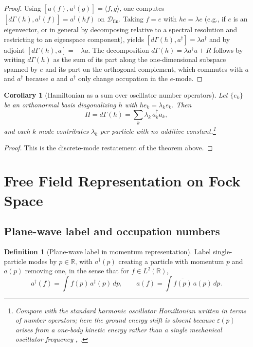 \documentclass[11pt]{article}
\theoremstyle{definition}
\newtheorem{definition}{Definition}
\theoremstyle{plain}
\newtheorem{corollary}{Corollary}
\numberwithin{equation}{section}
\begin{document}
\begin{proof}
Using $[a(f),a^\dagger(g)]=\langle f,g\rangle$, one computes $[d\Gamma(h),a^\dagger(f)]=a^\dagger(hf)$ on $\mathcal{D}_{\mathrm{fin}}$. Taking $f=e$ with $he=\lambda e$ (e.g., if $e$ is an eigenvector, or in general by decomposing relative to a spectral resolution and restricting to an eigenspace component), yields $[d\Gamma(h),a^\dagger]=\lambda a^\dagger$ and by adjoint $[d\Gamma(h),a]=-\lambda a$. The decomposition $d\Gamma(h)=\lambda a^\dagger a + R$ follows by writing $d\Gamma(h)$ as the sum of its part along the one-dimensional subspace spanned by $e$ and its part on the orthogonal complement, which commutes with $a$ and $a^\dagger$ because $a$ and $a^\dagger$ only change occupation in the $e$-mode.\end{proof}

\begin{corollary}[Hamiltonian as a sum over oscillator number operators]
Let $\{e_k\}$ be an orthonormal basis diagonalizing $h$ with $h e_k=\lambda_k e_k$. Then
\[
H=d\Gamma(h)=\sum_k \lambda_k\,a_k^\dagger a_k,
\]
and each $k$-mode contributes $\lambda_k$ per particle with no additive constant.\footnote{Compare with the standard harmonic oscillator Hamiltonian written in terms of number operators; here the ground energy shift is absent because $\varepsilon(p)$ arises from a one-body kinetic energy rather than a single mechanical oscillator frequency \cite[Sec.~3]{usp-3}, \cite{scholarpedia}.}
\end{corollary}

\begin{proof}
This is the discrete-mode restatement of the theorem above.\end{proof}

\section{Free Field Representation on Fock Space}

\subsection{Plane-wave label and occupation numbers}

\begin{definition}[Plane-wave label in momentum representation]
Label single-particle modes by $p\in\mathbb{R}$, with $a^\dagger(p)$ creating a particle with momentum $p$ and $a(p)$ removing one, in the sense that for $f\in L^2(\mathbb{R})$,
\[
a^\dagger(f)=\int f(p)\,a^\dagger(p)\,dp,\qquad a(f)=\int \overline{f(p)}\,a(p)\,dp.
\]
\end{definition}
\end{document}
